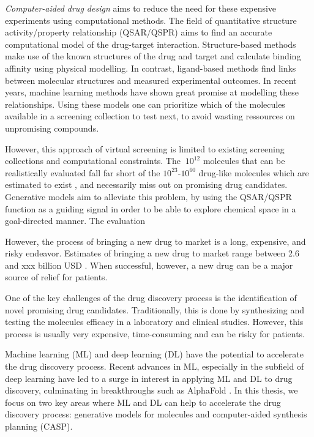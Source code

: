 \emph{Computer-aided drug design} aims to reduce the need 
for these expensive experiments using computational methods. 
The field of quantitative structure activity/property relationship (QSAR/QSPR)
aims to find an accurate computational model of the drug-target interaction. 
Structure-based methods make use of the known structures of the drug and target 
and calculate binding affinity using physical modelling. 
In contrast, ligand-based methods find links between molecular structures
and measured experimental outcomes. In recent years, machine learning methods 
have shown great promise at modelling these relationships. 
Using these models one can prioritize which of the molecules available in a screening 
collection to test next, to avoid wasting ressources on unpromising compounds.

However, this approach of virtual screening is limited to existing screening collections
and computational constraints. The $~10^{12}$ \citep{todo} molecules that can be realistically 
evaluated fall far short of the $10^{23}$-$10^{60}$ drug-like molecules 
which are estimated to exist \citep{todo}, and necessarily miss out on promising drug candidates.
Generative models aim to alleviate this problem, by using the QSAR/QSPR function as a guiding signal 
in order to be able to explore chemical space in a goal-directed manner. 
The evaluation 


However, the process of bringing a new drug to market is a long, expensive, and risky endeavor.
Estimates of bringing a new drug to market range between 2.6 and xxx 
billion USD \citep{todo}. When successful, however, a new drug can be a major source of
relief for patients.

One of the key challenges of the drug discovery process is the identification
of novel promising drug candidates. Traditionally, this is done by synthesizing
and testing the molecules efficacy in a laboratory and clinical studies. 
However, this process is usually very expensive, time-consuming and can be risky for 
patients. 

Machine learning (ML) and deep learning (DL) have the potential to accelerate
the drug discovery process. Recent advances in ML, especially in the subfield of deep learning
have led to a surge in interest in applying ML and DL to drug discovery, 
culminating in breakthroughs such as AlphaFold \citep{TODO}. 
In this thesis, we focus on two key areas where ML and DL can help to accelerate
the drug discovery process: generative models for molecules and computer-aided
synthesis planning (CASP).

